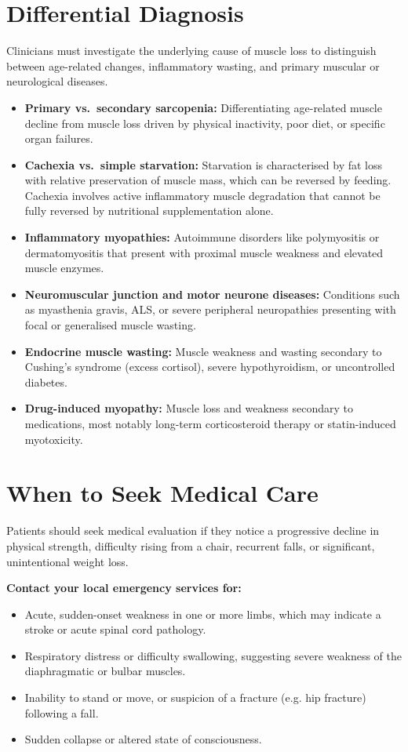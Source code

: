 \section*{Differential Diagnosis}
Clinicians must investigate the underlying cause of muscle loss to distinguish between age-related changes, inflammatory wasting, and primary muscular or neurological diseases.
\begin{itemize}
    \item \textbf{Primary vs.\ secondary sarcopenia:} Differentiating age-related muscle decline from muscle loss driven by physical inactivity, poor diet, or specific organ failures.
    \item \textbf{Cachexia vs.\ simple starvation:} Starvation is characterised by fat loss with relative preservation of muscle mass, which can be reversed by feeding. Cachexia involves active inflammatory muscle degradation that cannot be fully reversed by nutritional supplementation alone.
    \item \textbf{Inflammatory myopathies:} Autoimmune disorders like polymyositis or dermatomyositis that present with proximal muscle weakness and elevated muscle enzymes.
    \item \textbf{Neuromuscular junction and motor neurone diseases:} Conditions such as myasthenia gravis, ALS, or severe peripheral neuropathies presenting with focal or generalised muscle wasting.
    \item \textbf{Endocrine muscle wasting:} Muscle weakness and wasting secondary to Cushing's syndrome (excess cortisol), severe hypothyroidism, or uncontrolled diabetes.
    \item \textbf{Drug-induced myopathy:} Muscle loss and weakness secondary to medications, most notably long-term corticosteroid therapy or statin-induced myotoxicity.
\end{itemize}

\section*{When to Seek Medical Care}
Patients should seek medical evaluation if they notice a progressive decline in physical strength, difficulty rising from a chair, recurrent falls, or significant, unintentional weight loss.

\textbf{Contact your local emergency services for:}
\begin{itemize}
    \item Acute, sudden-onset weakness in one or more limbs, which may indicate a stroke or acute spinal cord pathology.
    \item Respiratory distress or difficulty swallowing, suggesting severe weakness of the diaphragmatic or bulbar muscles.
    \item Inability to stand or move, or suspicion of a fracture (e.g. hip fracture) following a fall.
    \item Sudden collapse or altered state of consciousness.
\end{itemize}

